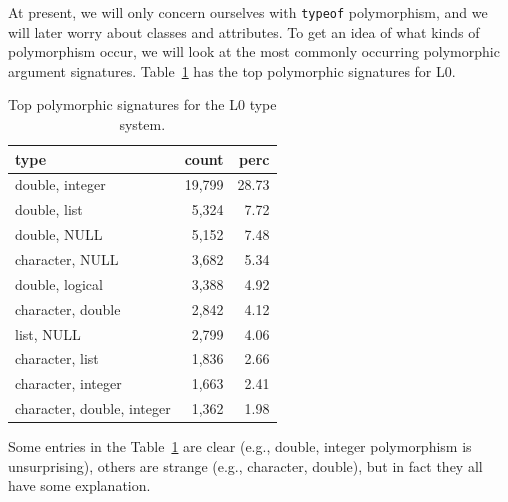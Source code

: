 \documentclass[acmsmall,10pt,review,anonymous]{acmart}\settopmatter{printfolios=true,printccs=false,printacmref=false}
\newcommand{\code}[1]{\lstinline|#1|\xspace}
\begin{document}
At present, we will only concern ourselves with \code{typeof} polymorphism, and we will later worry about classes and attributes.
To get an idea of what kinds of polymorphism occur, we will look at the most commonly occurring polymorphic argument signatures.
Table~\ref{tab:L1toppoly} has the top polymorphic signatures for L0.

\begin{table}[ht]
\label{tab:L1toppoly}
\centering
\begin{tabular}{lrr}
  \hline
type & count & perc \\ 
  \hline
  double, integer & 19,799 & 28.73 \\ 
  double, list & 5,324 & 7.72 \\ 
  double, NULL & 5,152 & 7.48 \\ 
  character, NULL & 3,682 & 5.34 \\ 
  double, logical & 3,388 & 4.92 \\ 
  character, double & 2,842 & 4.12 \\ 
  list, NULL & 2,799 & 4.06 \\ 
  character, list & 1,836 & 2.66 \\ 
  character, integer & 1,663 & 2.41 \\ 
  character, double, integer & 1,362 & 1.98 \\ 
   \hline
\end{tabular}
\caption{Top polymorphic signatures for the L0 type system.}
\end{table}

Some entries in the Table~\ref{tab:L1toppoly} are clear (e.g., double, integer polymorphism is unsurprising), others are strange (e.g., character, double), but in fact they all have some explanation.
\end{document}
